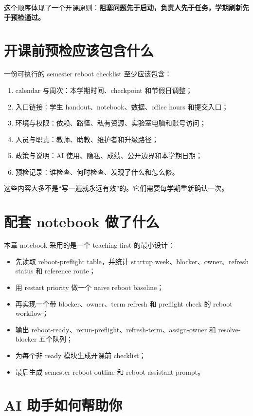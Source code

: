 这个顺序体现了一个开课原则：\textbf{阻塞问题先于启动，负责人先于任务，学期刷新先于预检通过。}

\section{开课前预检应该包含什么}

一份可执行的 semester reboot checklist 至少应该包含：

\begin{enumerate}
    \item calendar 与周次：本学期时间、checkpoint 和节假日调整；
    \item 入口链接：学生 handout、notebook、数据、office hours 和提交入口；
    \item 环境与权限：依赖、路径、私有资源、实验室电脑和账号访问；
    \item 人员与职责：教师、助教、维护者和升级路径；
    \item 政策与说明：AI 使用、隐私、成绩、公开边界和本学期日期；
    \item 预检记录：谁检查、何时检查、发现了什么和怎么修。
\end{enumerate}

这些内容大多不是“写一遍就永远有效”的。它们需要每学期重新确认一次。

\section{配套 notebook 做了什么}

本章 notebook 采用的是一个 teaching-first 的最小设计：

\begin{itemize}
    \item 先读取 reboot-preflight table，并统计 startup week、blocker、owner、refresh status 和 reference route；
    \item 用 restart priority 做一个 naive reboot baseline；
    \item 再实现一个带 blocker、owner、term refresh 和 preflight check 的 reboot workflow；
    \item 输出 reboot-ready、rerun-preflight、refresh-term、assign-owner 和 resolve-blocker 五个队列；
    \item 为每个非 ready 模块生成开课前 checklist；
    \item 最后生成 semester reboot outline 和 reboot assistant prompt。
\end{itemize}

\section{AI 助手如何帮助你}

